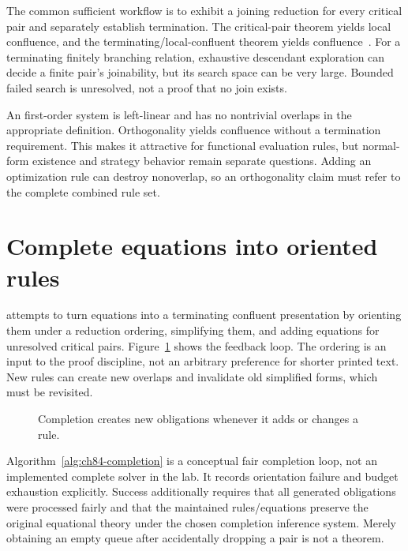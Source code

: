 The common sufficient workflow is to exhibit a joining reduction for every critical pair and separately establish termination.
The critical-pair theorem yields local confluence, and the terminating/local-confluent theorem yields confluence~\cite{ohlebusch-2002-rewriting}.
For a terminating finitely branching relation, exhaustive descendant exploration can decide a finite pair's joinability, but its search space can be very large.
Bounded failed search is unresolved, not a proof that no join exists.

An  first-order system is left-linear and has no nontrivial overlaps in the appropriate definition.
Orthogonality yields confluence without a termination requirement.
This makes it attractive for functional evaluation rules, but normal-form existence and strategy behavior remain separate questions.
Adding an optimization rule can destroy nonoverlap, so an orthogonality claim must refer to the complete combined rule set.

\section{Complete equations into oriented rules}
\label{sec:ch84-completion}
 attempts to turn equations into a terminating confluent presentation by orienting them under a reduction ordering, simplifying them, and adding equations for unresolved critical pairs.
Figure~\ref{fig:ch84-loop} shows the feedback loop.
The ordering is an input to the proof discipline, not an arbitrary preference for shorter printed text.
New rules can create new overlaps and invalidate old simplified forms, which must be revisited.

\begin{figure}[htbp]
\centering
{}
\caption{Completion creates new obligations whenever it adds or changes a rule.}
\label{fig:ch84-loop}
\end{figure}

Algorithm~\ref{alg:ch84-completion} is a conceptual fair completion loop, not an implemented complete solver in the lab.
It records orientation failure and budget exhaustion explicitly.
Success additionally requires that all generated obligations were processed fairly and that the maintained rules/equations preserve the original equational theory under the chosen completion inference system.
Merely obtaining an empty queue after accidentally dropping a pair is not a theorem.

